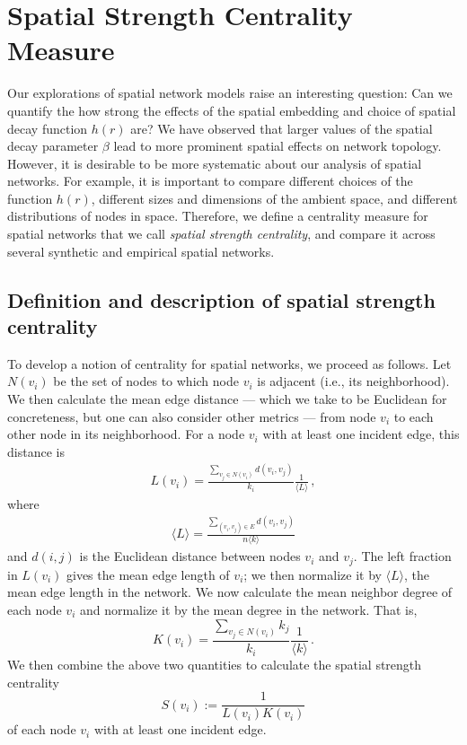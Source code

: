 \documentclass[%
 reprint,
 amsmath,amssymb,
 aps,
]{revtex4-1}
\begin{document}

\section{Spatial Strength Centrality Measure} \label{sec:spatial_strength}

Our explorations of spatial network models raise an interesting question: Can we quantify the how strong the effects of the spatial embedding and choice of spatial decay function $h(r)$ are? We have observed that larger values of the spatial decay parameter $\beta$ lead to more prominent spatial effects on network topology. However, it is desirable to be more systematic about our analysis of spatial networks. For example, it is important to compare different choices of the function $h(r)$, different sizes and dimensions of the ambient space, and different distributions of nodes in space. Therefore, we define a centrality measure for spatial networks that we call \emph{spatial strength centrality}, and compare it across several synthetic and empirical spatial networks.


\subsection{Definition and description of spatial strength centrality}


To develop a notion of centrality for spatial networks, we proceed as follows. Let $N(v_i)$ be the set of nodes to which node $v_i$ is adjacent (i.e., its neighborhood). We then calculate the mean edge distance --- which we take to be Euclidean for concreteness, but one can also consider other metrics --- from node $v_i$ to each other node in its neighborhood. For a node $v_i$ with at least one incident edge, this distance is
\begin{align}
    L(v_i) = \frac{\sum_{v_j \in N(v_i)}d(v_i, v_j)}{k_i} \frac{1}{{\langle L \rangle}}\,,
\label{eq:v_edge_length}
\end{align}
where
\begin{align}
    \langle L \rangle = \frac{\sum_{(v_i, v_j) \in E}d(v_i, v_j)}{n \langle k \rangle}
\end{align}
and $d(i, j)$ is the Euclidean distance between nodes $v_i$ and $v_j$. The left fraction in $L(v_i)$ gives the mean edge length of $v_i$; we then normalize it by $\langle L \rangle$, the mean edge length in the network. We now calculate the mean neighbor degree of each node $v_i$ and normalize it by the mean degree in the network. That is,
\begin{equation}
    K(v_i) = \frac{\sum_{v_j \in N(v_i)} k_j}{k_i} \frac{1}{\langle k \rangle}\,.
\end{equation}
We then combine the above two quantities to calculate the spatial strength centrality
\begin{equation} \label{eq:spatial_strength}
    S(v_i) := \frac{1}{L(v_i)K(v_i)}
\end{equation}
of each node $v_i$ with at least one incident edge.
\end{document}
